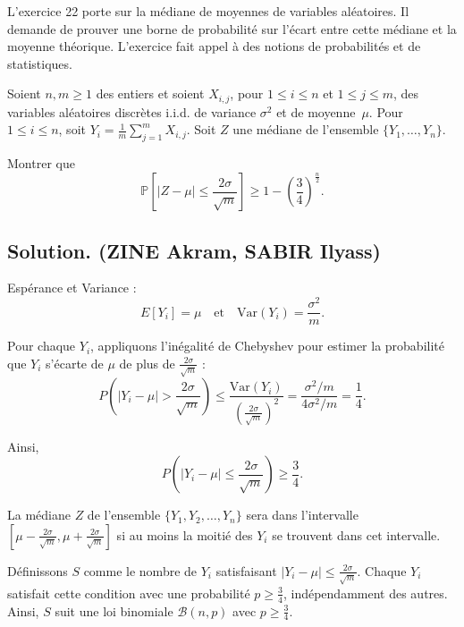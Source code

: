 L'exercice 22 porte sur la m{\'e}diane de moyennes de variables
al{\'e}atoires. Il demande de prouver une borne de probabilit{\'e} sur
l'{\'e}cart entre cette m{\'e}diane et la moyenne th{\'e}orique. L'exercice
fait appel {\`a} des notions de probabilit{\'e}s et de statistiques.

\begin{exercise}
Soient $n, m \geq 1$ des entiers et soient $X_{i, j}$, pour $1 \leq i \leq n$
et $1 \leq j \leq m$, des variables al{\'e}atoires discr{\`e}tes i.i.d. de
variance $\sigma^2$ et de moyenne~$\mu$. Pour~$1 \leq i \leq n$, soit $Y_i =
\frac{1}{m}  \sum_{j = 1}^m X_{i, j}$. Soit $Z$ une m{\'e}diane de l'ensemble
$\{ Y_1, \ldots, Y_n \}$.

Montrer que
\[ \mathbb{P} \left[ |Z - \mu | \leq \frac{2 \sigma}{\sqrt{m}} \right] \geq 1
   - \left( \frac{3}{4} \right)^{\frac{n}{2}} . \]

\end{exercise}

\subsection*{Solution. (ZINE Akram, SABIR Ilyass)}

Esp{\'e}rance et Variance :\tmtextbf{}
\[ E [Y_i] = \mu \quad \text{et} \quad \text{Var} (Y_i) = \frac{\sigma^2}{m} .
\]


Pour chaque $Y_i$, appliquons l'in{\'e}galit{\'e} de Chebyshev pour estimer la
probabilit{\'e} que $Y_i$ s'{\'e}carte de $\mu$ de plus de $\frac{2
\sigma}{\sqrt{m}}$ :
\[ P \left( |Y_i - \mu | > \frac{2 \sigma}{\sqrt{m}} \right) \leq
   \frac{\text{Var} (Y_i)}{\left( \frac{2 \sigma}{\sqrt{m}} \right)^2} =
   \frac{\sigma^2 / m}{4 \sigma^2 / m} = \frac{1}{4} . \]


Ainsi,
\[ P \left( |Y_i - \mu | \leq \frac{2 \sigma}{\sqrt{m}} \right) \geq
   \frac{3}{4} . \]


La m{\'e}diane $Z$ de l'ensemble $\{Y_1, Y_2, \ldots, Y_n \}$ sera dans
l'intervalle $\left[ \mu - \frac{2 \sigma}{\sqrt{m}}, \mu + \frac{2
\sigma}{\sqrt{m}} \right]$ si au moins la moiti{\'e} des $Y_i$ se trouvent
dans cet intervalle.

D{\'e}finissons $S$ comme le nombre de $Y_i$ satisfaisant $|Y_i - \mu | \leq
\frac{2 \sigma}{\sqrt{m}}$. Chaque $Y_i$ satisfait cette condition avec une
probabilit{\'e} $p \geq \frac{3}{4}$, ind{\'e}pendamment des autres. Ainsi,
$S$ suit une loi binomiale $\mathcal{B}(n, p)$ avec $p \geq \frac{3}{4}$.

